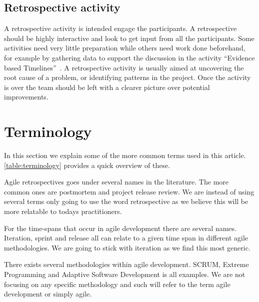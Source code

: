 \documentclass[12pt]{article}
\begin{document}
\subsection{Retrospective activity}
A retrospective activity is intended engage the participants. A retrospective should be highly interactive and look to get input from all the participants. Some activities need very little preparation while others need work done beforehand, for example by gathering data to support the discussion in the activity ``Evidence based Timelines''~\cite{Bjarnason2012}. A retrospective activity is usually aimed at uncovering the root cause of a problem, or identifying patterns in the project. Once the activity is over the team should be left with a clearer picture over potential improvements.

\section{Terminology}
In this section we explain some of the more common terms used in this article. \autoref{table:terminology} provides a quick overview of these. 

Agile retrospectives goes under several names in the literature. The more common ones are postmortem and project release review. We are instead of using several terms only going to use the word retrospective as we believe this will be more relatable to todays practitioners. 

For the time-spans that occur in agile development there are several names. Iteration, sprint and release all can relate to a given time span in different agile methodologies. We are going to stick with iteration as we find this most generic. 

There exists several methodologies within agile development. SCRUM, Extreme Programming and Adaptive Software Development is all examples. We are not focusing on any specific methodology and such will refer to the term agile development or simply agile. 
\end{document}
